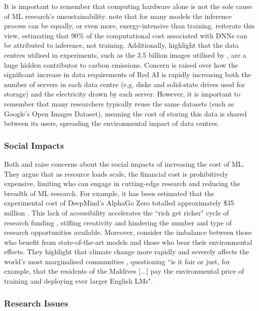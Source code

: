 \documentclass[a4paper, 12pt]{article}
\begin{document}
    It is important to remember that computing hardware alone is not the sole cause of ML research's unsustainability.  note that for many models the inference process can be equally, or even more, energy-intensive than training.  reiterate this view, estimating that 90\% of the computational cost associated with DNNs can be attributed to inference, not training. Additionally,   highlight that the data centres utilised in experiments, such as the 3.5 billion images utilised by , are a huge hidden contributor to carbon emissions. Concern is raised over how the significant increase in data requirements of Red AI is rapidly increasing both the number of servers in each data centre (e.g. disks and solid-state drives used for storage) and the electricity drawn by each server. However, it is important to remember that many researchers typically reuse the same datasets (such as Google's Open Images Dataset), meaning the cost of storing this data is shared between its users, spreading the environmental impact of data centres. 

    \subsubsection{Social Impacts}

    Both  and  raise concerns about the social impacts of increasing the cost of ML. They argue that as resource loads scale, the financial cost is prohibitively expensive, limiting who can engage in cutting-edge research and reducing the breadth of ML research. For example, it has been estimated that the experimental cost of DeepMind's AlphaGo Zero \cite{silver-2017} totalled approximately \$35 million \cite{schwartz-2019}. This lack of accessibility accelerates the ``rich get richer" cycle of research funding \cite{strubell-2019}, stifling creativity and hindering the number and type of research opportunities available. Moreover,  consider the imbalance between those who benefit from state-of-the-art models and those who bear their environmental effects. They highlight that climate change more rapidly and severely affects the world's most marginalised communities \cite{un-social-survey}, questioning ``is it fair or just, for example, that the residents of the Maldives [...] pay the environmental price of training and deploying ever larger English LMs".

    \subsubsection{Research Issues}
\end{document}
